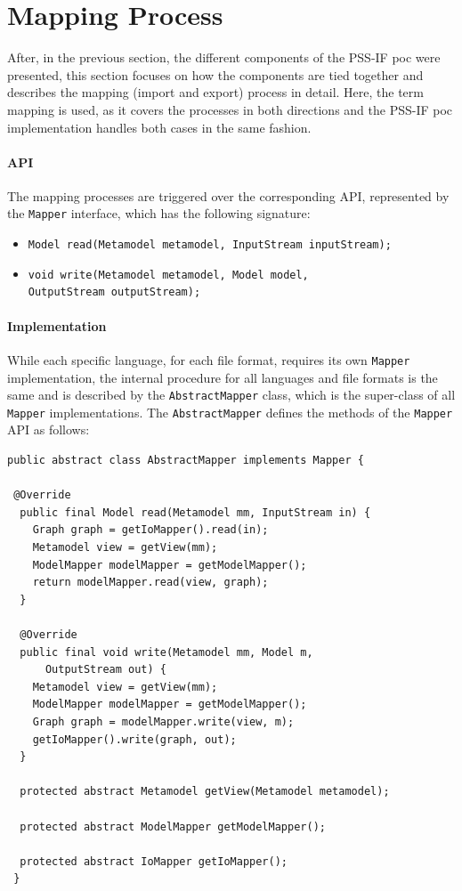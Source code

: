 \section{Mapping Process}
\label{sec:impl:process}

After, in the previous section, the different components of the PSS-IF \gls{poc} were presented, this section focuses on how the components are tied together and describes the mapping (import and export) process in detail. Here, the term mapping is used, as it covers the processes in both directions and the PSS-IF \gls{poc} implementation handles both cases in the same fashion.

\paragraph{API} The mapping processes are triggered over the corresponding API, represented by the \texttt{Mapper} interface, which has the following signature:

\begin{itemize}
\item \texttt{Model read(Metamodel metamodel, InputStream inputStream);}
\item \texttt{void write(Metamodel metamodel, Model model,}\\ \texttt{OutputStream outputStream);}
\end{itemize}

\paragraph{Implementation} While each specific language, for each file format, requires its own \texttt{Mapper} implementation, the internal procedure for all languages and file formats is the same and is described by the \texttt{AbstractMapper} class, which is the super-class of all \texttt{Mapper} implementations. The \texttt{AbstractMapper} defines the methods of the \texttt{Mapper} API as follows:

\begin{verbatim}
public abstract class AbstractMapper implements Mapper {

 @Override
  public final Model read(Metamodel mm, InputStream in) {
    Graph graph = getIoMapper().read(in);
    Metamodel view = getView(mm);
    ModelMapper modelMapper = getModelMapper();
    return modelMapper.read(view, graph);
  }

  @Override
  public final void write(Metamodel mm, Model m, 
      OutputStream out) {
    Metamodel view = getView(mm);
    ModelMapper modelMapper = getModelMapper();
    Graph graph = modelMapper.write(view, m);
    getIoMapper().write(graph, out);
  }

  protected abstract Metamodel getView(Metamodel metamodel);

  protected abstract ModelMapper getModelMapper();

  protected abstract IoMapper getIoMapper();
 }
\end{verbatim}

